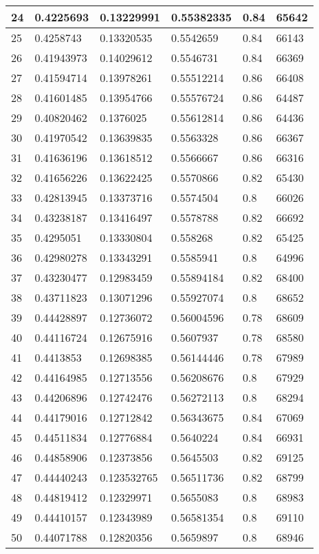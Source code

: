\begin{longtable}{|l|l|l|l|l|l|}
24 & 0.4225693 & 0.13229991 & 0.55382335 & 0.84 & 65642 \\ \hline 
25 & 0.4258743 & 0.13320535 & 0.5542659 & 0.84 & 66143 \\ \hline 
26 & 0.41943973 & 0.14029612 & 0.5546731 & 0.84 & 66369 \\ \hline 
27 & 0.41594714 & 0.13978261 & 0.55512214 & 0.86 & 66408 \\ \hline 
28 & 0.41601485 & 0.13954766 & 0.55576724 & 0.86 & 64487 \\ \hline 
29 & 0.40820462 & 0.1376025 & 0.55612814 & 0.86 & 64436 \\ \hline 
30 & 0.41970542 & 0.13639835 & 0.5563328 & 0.86 & 66367 \\ \hline 
31 & 0.41636196 & 0.13618512 & 0.5566667 & 0.86 & 66316 \\ \hline 
32 & 0.41656226 & 0.13622425 & 0.5570866 & 0.82 & 65430 \\ \hline 
33 & 0.42813945 & 0.13373716 & 0.5574504 & 0.8 & 66026 \\ \hline 
34 & 0.43238187 & 0.13416497 & 0.5578788 & 0.82 & 66692 \\ \hline 
35 & 0.4295051 & 0.13330804 & 0.558268 & 0.82 & 65425 \\ \hline 
36 & 0.42980278 & 0.13343291 & 0.5585941 & 0.8 & 64996 \\ \hline 
37 & 0.43230477 & 0.12983459 & 0.55894184 & 0.82 & 68400 \\ \hline 
38 & 0.43711823 & 0.13071296 & 0.55927074 & 0.8 & 68652 \\ \hline 
39 & 0.44428897 & 0.12736072 & 0.56004596 & 0.78 & 68609 \\ \hline 
40 & 0.44116724 & 0.12675916 & 0.5607937 & 0.78 & 68580 \\ \hline 
41 & 0.4413853 & 0.12698385 & 0.56144446 & 0.78 & 67989 \\ \hline 
42 & 0.44164985 & 0.12713556 & 0.56208676 & 0.8 & 67929 \\ \hline 
43 & 0.44206896 & 0.12742476 & 0.56272113 & 0.8 & 68294 \\ \hline 
44 & 0.44179016 & 0.12712842 & 0.56343675 & 0.84 & 67069 \\ \hline 
45 & 0.44511834 & 0.12776884 & 0.5640224 & 0.84 & 66931 \\ \hline 
46 & 0.44858906 & 0.12373856 & 0.5645503 & 0.82 & 69125 \\ \hline 
47 & 0.44440243 & 0.123532765 & 0.56511736 & 0.82 & 68799 \\ \hline 
48 & 0.44819412 & 0.12329971 & 0.5655083 & 0.8 & 68983 \\ \hline 
49 & 0.44410157 & 0.12343989 & 0.56581354 & 0.8 & 69110 \\ \hline 
50 & 0.44071788 & 0.12820356 & 0.5659897 & 0.8 & 68946 \\ \hline 
\end{longtable}